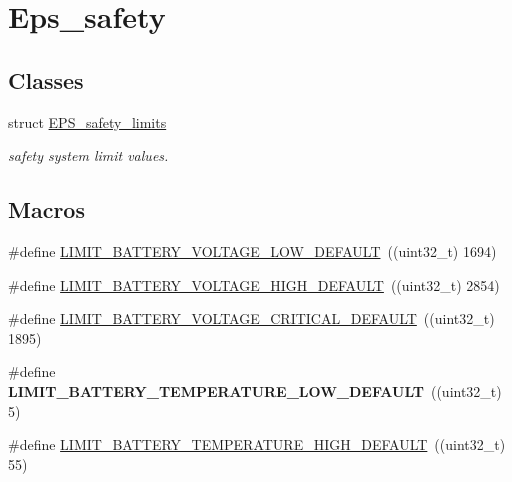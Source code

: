 \hypertarget{group__eps__safety}{\section{Eps\-\_\-safety}
\label{group__eps__safety}
}
\subsection*{Classes}
\begin{DoxyCompactItemize}
\item 
struct \hyperlink{struct_e_p_s__safety__limits}{E\-P\-S\-\_\-safety\-\_\-limits}
\begin{DoxyCompactList}\small\item\em safety system limit values. \end{DoxyCompactList}\end{DoxyCompactItemize}
\subsection*{Macros}
\begin{DoxyCompactItemize}
\item 
\#define \hyperlink{group__eps__safety_ga5dddaf23079a7dca9a9c4f4439926cf3}{L\-I\-M\-I\-T\-\_\-\-B\-A\-T\-T\-E\-R\-Y\-\_\-\-V\-O\-L\-T\-A\-G\-E\-\_\-\-L\-O\-W\-\_\-\-D\-E\-F\-A\-U\-L\-T}~((uint32\-\_\-t) 1694)
\item 
\#define \hyperlink{group__eps__safety_gad02e2ee8c31f47248226e2096de49820}{L\-I\-M\-I\-T\-\_\-\-B\-A\-T\-T\-E\-R\-Y\-\_\-\-V\-O\-L\-T\-A\-G\-E\-\_\-\-H\-I\-G\-H\-\_\-\-D\-E\-F\-A\-U\-L\-T}~((uint32\-\_\-t) 2854)
\item 
\#define \hyperlink{group__eps__safety_ga8bf211e2280e0f8098f3b6c23a750b12}{L\-I\-M\-I\-T\-\_\-\-B\-A\-T\-T\-E\-R\-Y\-\_\-\-V\-O\-L\-T\-A\-G\-E\-\_\-\-C\-R\-I\-T\-I\-C\-A\-L\-\_\-\-D\-E\-F\-A\-U\-L\-T}~((uint32\-\_\-t) 1895)
\item 
\hypertarget{group__eps__safety_ga1a5e7b24738a256e56f93da19e732bba}{\#define {\bfseries L\-I\-M\-I\-T\-\_\-\-B\-A\-T\-T\-E\-R\-Y\-\_\-\-T\-E\-M\-P\-E\-R\-A\-T\-U\-R\-E\-\_\-\-L\-O\-W\-\_\-\-D\-E\-F\-A\-U\-L\-T}~((uint32\-\_\-t) 5)}\label{group__eps__safety_ga1a5e7b24738a256e56f93da19e732bba}

\item 
\#define \hyperlink{group__eps__safety_ga4b0c4dfb6628ab3e7fbb0d87493c4c7d}{L\-I\-M\-I\-T\-\_\-\-B\-A\-T\-T\-E\-R\-Y\-\_\-\-T\-E\-M\-P\-E\-R\-A\-T\-U\-R\-E\-\_\-\-H\-I\-G\-H\-\_\-\-D\-E\-F\-A\-U\-L\-T}~((uint32\-\_\-t) 55)
\end{DoxyCompactItemize}
